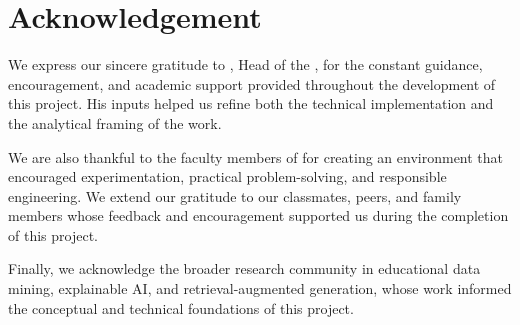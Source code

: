 \chapter*{Acknowledgement}

We express our sincere gratitude to \textbf{\guidefaculty}, Head of the \textbf{\departmentname}, for the constant guidance, encouragement, and academic support provided throughout the development of this project. His inputs helped us refine both the technical implementation and the analytical framing of the work.

We are also thankful to the faculty members of \textbf{\institutionname} for creating an environment that encouraged experimentation, practical problem-solving, and responsible engineering. We extend our gratitude to our classmates, peers, and family members whose feedback and encouragement supported us during the completion of this project.

Finally, we acknowledge the broader research community in educational data mining, explainable AI, and retrieval-augmented generation, whose work informed the conceptual and technical foundations of this project.

\clearpage
